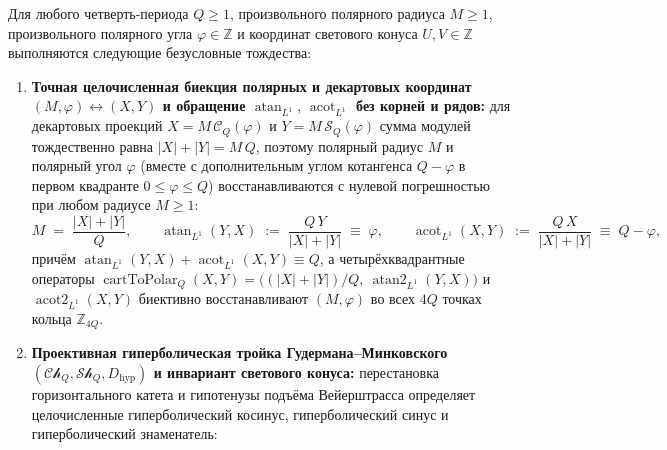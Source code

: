 \begin{theorem}
\label{thm:math-inverse-trig-hyperbolic}
\leanok
Для любого четверть-периода $Q \ge 1$, произвольного полярного радиуса $M \ge 1$, произвольного полярного угла $\varphi \in \mathbb{Z}$ и координат светового конуса $U, V \in \mathbb{Z}$ выполняются следующие безусловные тождества:
\begin{enumerate}[label=\textbf{(\arabic*)},leftmargin=*]
\item \textbf{Точная целочисленная биекция полярных и декартовых координат $(M, \varphi) \leftrightarrow (X, Y)$ и обращение $\operatorname{atan}_{L^1},\,\operatorname{acot}_{L^1}$ без корней и рядов:}
  для декартовых проекций $X = M\,\mathcal{C}_Q(\varphi)$ и $Y = M\,\mathcal{S}_Q(\varphi)$ сумма модулей тождественно равна $|X| + |Y| = M\,Q$, поэтому полярный радиус $M$ и полярный угол $\varphi$ (вместе с дополнительным углом котангенса $Q - \varphi$ в первом квадранте $0 \le \varphi \le Q$) восстанавливаются с нулевой погрешностью при любом радиусе $M \ge 1$:
  \begin{equation}
    \label{eq:math-atan-acot-l1}
    M \;=\; \frac{|X| + |Y|}{Q}, \qquad
    \operatorname{atan}_{L^1}(Y, X) \;:=\; \frac{Q\,Y}{|X| + |Y|} \;\equiv\; \varphi, \qquad
    \operatorname{acot}_{L^1}(X, Y) \;:=\; \frac{Q\,X}{|X| + |Y|} \;\equiv\; Q - \varphi,
  \end{equation}
  причём $\operatorname{atan}_{L^1}(Y, X) + \operatorname{acot}_{L^1}(X, Y) \equiv Q$, а четырёхквадрантные операторы $\operatorname{cartToPolar}_Q(X, Y) = \bigl((|X|+|Y|)/Q,\ \operatorname{atan2}_{L^1}(Y, X)\bigr)$ и $\operatorname{acot2}_{L^1}(X, Y)$ биективно восстанавливают $(M, \varphi)$ во всех $4Q$ точках кольца $\mathbb{Z}_{4Q}$.
\item \textbf{Проективная гиперболическая тройка Гудермана--Минковского $(\mathcal{Ch}_Q, \mathcal{Sh}_Q, D_{\mathrm{hyp}})$ и инвариант светового конуса:}
  перестановка горизонтального катета и гипотенузы подъёма Вейерштрасса определяет целочисленные гиперболический косинус, гиперболический синус и гиперболический знаменатель:
  \begin{equation}
    \label{eq:math-gudermann-hyperbolic-triple}

\end{equation}
\end{enumerate}
\end{theorem}
